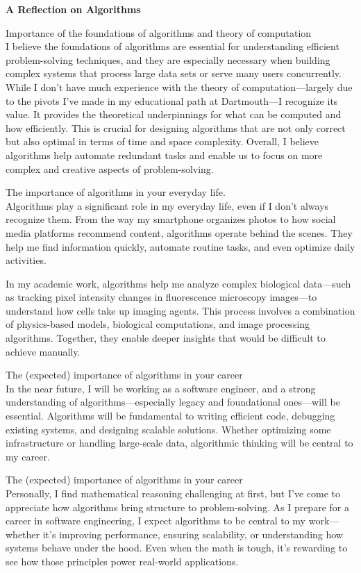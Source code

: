 \textbf{A Reflection on Algorithms} \\
\begin{questions}
    \question Importance of the foundations of algorithms and theory of computation \\
       I believe the foundations of algorithms are essential for understanding efficient problem-solving techniques, and they are especially necessary 
       when building complex systems that process large data sets or serve many users concurrently. While I don't have much experience with the theory of computation—largely due 
       to the pivots I've made in my educational path at Dartmouth—I recognize its value. It provides the theoretical underpinnings for what can be computed and how efficiently. 
       This is crucial for designing algorithms that are not only correct but also optimal in terms of time and space complexity. Overall, I believe algorithms 
       help automate redundant tasks and enable us to focus on more complex and creative aspects of problem-solving.
    
    \question The importance of algorithms in your everyday life. \\
        Algorithms play a significant role in my everyday life, even if I don't always recognize them. From the way my smartphone organizes photos to how social media platforms 
        recommend content, algorithms operate behind the scenes. They help me find information quickly, automate routine tasks, and even optimize daily activities. 

        In my academic work, algorithms help me analyze complex biological data—such as tracking pixel intensity changes in fluorescence microscopy images—to understand how cells take up 
        imaging agents. This process involves a combination of physics-based models, biological computations, and image processing algorithms. Together, they enable deeper insights that 
        would be difficult to achieve manually.

    \question The (expected) importance of algorithms in your career \\
        In the near future, I will be working as a software engineer, and a strong understanding of algorithms—especially legacy and foundational ones—will be essential. 
        Algorithms will be fundamental to writing efficient code, debugging existing systems, and designing scalable solutions. Whether optimizing some infrastructure or handling 
        large-scale data, algorithmic thinking will be central to my career.

    \question The (expected) importance of algorithms in your career \\
        Personally, I find mathematical reasoning challenging at first, but I've come to appreciate how algorithms bring structure to problem-solving. 
        As I prepare for a career in software engineering, I expect algorithms to be central to my work—whether it's improving performance, ensuring scalability, or 
        understanding how systems behave under the hood. Even when the math is tough, it's rewarding to see how those principles power real-world applications.
 
\end{questions}
